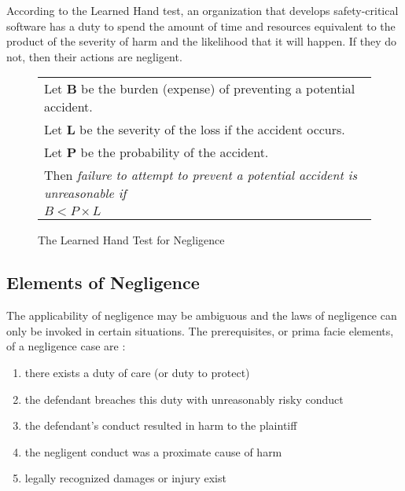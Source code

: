 According to the Learned Hand test, an organization that develops 
safety-critical software has a duty to spend the amount of time and resources
equivalent to the product of the severity of harm and the likelihood that it
will happen. If they do not, then their actions are negligent.

\begin{figure}
\begin{narrow}{-1.5in}{-1.5in}\begin{center}
\begin{tabular}{|l|}
\hline
	Let \textbf{B} be the burden (expense) of preventing a potential accident.\\
	Let \textbf{L} be the severity of the loss if the accident occurs.\\
	Let \textbf{P} be the probability of the accident.\\[6pt]
	Then \textit{failure to attempt to prevent a potential accident is 
	unreasonable if}\\[8pt]

      \centerline{\(B < P \times L\)}
\\[3pt]
\hline
\end{tabular}
\end{center}\end{narrow}
\caption{The Learned Hand Test for Negligence}
\label{fig:handtest}
\end{figure}

\subsection{Elements of Negligence}\label{SS:Elements}
The applicability of negligence may be ambiguous and the laws of negligence can
only be invoked in certain situations. The prerequisites, or prima facie
elements, of a negligence case are \cite{Dobbs01}:

\singlespace
\begin{enumerate}
 \item there exists a duty of care (or duty to protect)
 \item the defendant breaches this duty with unreasonably risky conduct
 \item the defendant's conduct resulted in harm to the plaintiff
 \item the negligent conduct was a proximate cause of harm
 \item legally recognized damages or injury exist
\end{enumerate}
\doublespace

